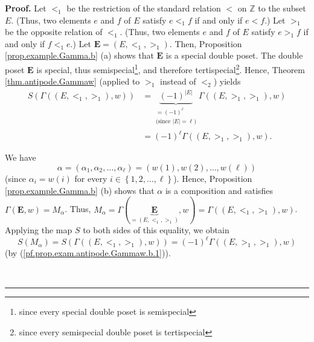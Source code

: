 \documentclass[numbers=enddot,12pt,final,onecolumn,notitlepage,abstracton]{scrartcl}
\theoremstyle{definition}
\newenvironment{proof}[1][Proof]{\noindent\textbf{#1.} }{\ \rule{0.5em}{0.5em}}
\newenvironment{verlong}{}{}
\begin{document}
\begin{verlong}
\begin{footnotesize}
\begin{proof}
Let $<_{1}$ be the restriction of the standard relation $<$ on $\mathbb{Z}$ to
the subset $E$. (Thus, two elements $e$ and $f$ of $E$ satisfy $e<_{1}f$ if
and only if $e<f$.) Let $>_{1}$ be the opposite relation of $<_{1}$. (Thus,
two elements $e$ and $f$ of $E$ satisfy $e>_{1}f$ if and only if $f<_{1}e$.)
Let ${\mathbf{E}}=\left(  E,<_{1},>_{1}\right)  $. Then, Proposition
\ref{prop.example.Gamma.b} (a) shows that $\mathbf{E}$ is a special double
poset. The double poset $\mathbf{E}$ is special, thus
semispecial\footnote{since every special double poset is semispecial}, and
therefore tertispecial\footnote{since every semispecial double poset is
tertispecial}. Hence, Theorem \ref{thm.antipode.Gammaw} (applied to $>_{1}$
instead of $<_{2}$) yields%
\begin{align}
S\left(  \Gamma\left(  \left(  E,<_{1},>_{1}\right)  ,w\right)  \right)   &
=\underbrace{\left(  -1\right)  ^{\left\vert E\right\vert }}%
_{\substack{=\left(  -1\right)  ^{\ell}\\\text{(since }\left\vert E\right\vert
=\ell\text{)}}}\Gamma\left(  \left(  E,>_{1},>_{1}\right)  ,w\right)
\nonumber\\
&  =\left(  -1\right)  ^{\ell}\Gamma\left(  \left(  E,>_{1},>_{1}\right)
,w\right)  . \label{pf.prop.exam.antipode.Gammaw.b.1}%
\end{align}


We have%
\[
\alpha=\left(  \alpha_{1},\alpha_{2},\ldots,\alpha_{\ell}\right)  =\left(
w\left(  1\right)  ,w\left(  2\right)  ,\ldots,w\left(  \ell\right)  \right)
\]
(since $\alpha_{i}=w\left(  i\right)  $ for every $i\in\left\{  1,2,\ldots
,\ell\right\}  $). Hence, Proposition \ref{prop.example.Gamma.b} (b) shows
that $\alpha$ is a composition and satisfies $\Gamma\left(  {\mathbf{E}%
},w\right)  =M_{\alpha}$. Thus, $M_{\alpha}=\Gamma\left(
\underbrace{{\mathbf{E}}}_{=\left(  E,<_{1},>_{1}\right)  },w\right)
=\Gamma\left(  \left(  E,<_{1},>_{1}\right)  ,w\right)  $. Applying the map
$S$ to both sides of this equality, we obtain%
\begin{equation}
S\left(  M_{\alpha}\right)  =S\left(  \Gamma\left(  \left(  E,<_{1}%
,>_{1}\right)  ,w\right)  \right)  =\left(  -1\right)  ^{\ell}\Gamma\left(
\left(  E,>_{1},>_{1}\right)  ,w\right)
\label{pf.prop.exam.antipode.Gammaw.b.2}%
\end{equation}
(by (\ref{pf.prop.exam.antipode.Gammaw.b.1})).


\end{proof}
\end{footnotesize}
\end{verlong}
\end{document}
